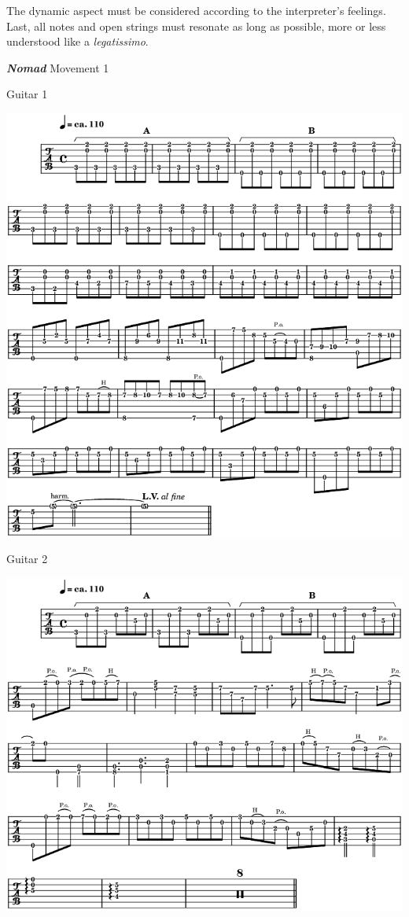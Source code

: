 \bigskip

The dynamic aspect must be considered according to the interpreter's feelings. Last, all notes and open strings must resonate as long as possible, more or less understood like a \textit{legatissimo}.
\newpage

 \quad \textbf{\textsl{Nomad}} Movement 1 

\smallskip

 \quad \quad Guitar 1

\begin{center}
\includegraphics[scale=0.5]{img/neA1}
\end{center}

 \quad \quad Guitar 2

\begin{center}
\includegraphics[scale=0.5]{img/neA2}
\end{center}

